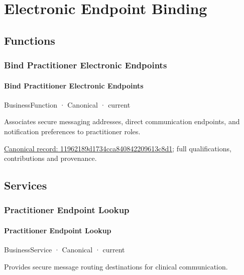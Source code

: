 \section{Electronic Endpoint Binding}

\subsection{Functions}

\subsubsection{Bind Practitioner Electronic Endpoints}

\paragraph{Bind Practitioner Electronic Endpoints}

\label{element:11962189d1734cca840842209613c8d1}
{\small BusinessFunction · Canonical · current}\par

Associates secure messaging addresses, direct communication endpoints, and notification preferences to practitioner roles.


{\footnotesize \href{../../../../continuum/business/business-function/11962189d1734cca840842209613c8d1.md}{Canonical record: 11962189d1734cca840842209613c8d1}; full qualifications, contributions and provenance.}\par
\subsection{Services}

\subsubsection{Practitioner Endpoint Lookup}

\paragraph{Practitioner Endpoint Lookup}

\label{element:2efb21629acf41e9b4f5c59db00721d0}
{\small BusinessService · Canonical · current}\par

Provides secure message routing destinations for clinical communication.


